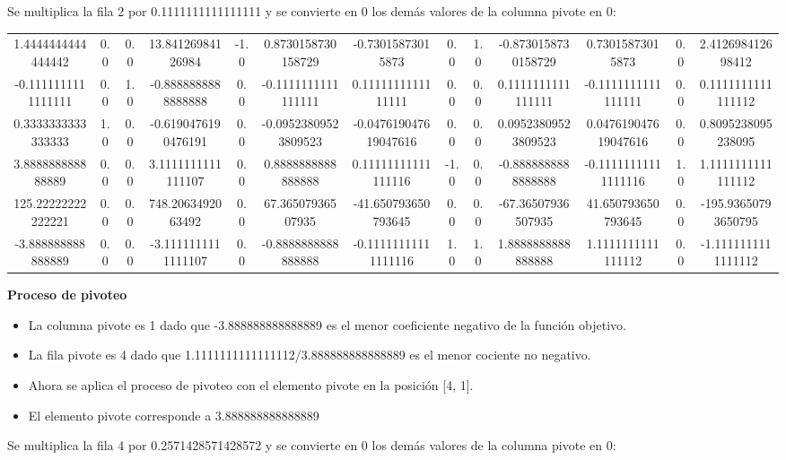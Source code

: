 \documentclass{article} %
\begin{document}
Se multiplica la fila  2 por 0.1111111111111111  y se convierte en 0 los demás valores de la columna pivote en 0: 
\begin{center}
\begin{tabular}{|cccccccccccc|c|}\hline
1.4444444444444442 & 0.0 & 0.0 & 13.84126984126984 & -1.0 & 0.8730158730158729 & -0.73015873015873 & 0.0 & 1.0 & -0.8730158730158729 & 0.73015873015873 & 0.0 & 2.412698412698412  \\
-0.1111111111111111 & 0.0 & 1.0 & -0.8888888888888888 & 0.0 & -0.1111111111111111 & 0.1111111111111111 & 0.0 & 0.0 & 0.1111111111111111 & -0.1111111111111111 & 0.0 & 0.1111111111111112  \\
0.3333333333333333 & 1.0 & 0.0 & -0.6190476190476191 & 0.0 & -0.09523809523809523 & -0.047619047619047616 & 0.0 & 0.0 & 0.09523809523809523 & 0.047619047619047616 & 0.0 & 0.8095238095238095  \\
3.888888888888889 & 0.0 & 0.0 & 3.1111111111111107 & 0.0 & 0.8888888888888888 & 0.11111111111111116 & -1.0 & 0.0 & -0.8888888888888888 & -0.11111111111111116 & 1.0 & 1.1111111111111112  \\
\hline
125.22222222222221 & 0.0 & 0.0 & 748.2063492063492 & 0.0 & 67.36507936507935 & -41.650793650793645 & 0.0 & 0.0 & -67.36507936507935 & 41.650793650793645 & 0.0 & -195.93650793650795  \\
-3.888888888888889 & 0.0 & 0.0 & -3.1111111111111107 & 0.0 & -0.8888888888888888 & -0.11111111111111116 & 1.0 & 1.0 & 1.8888888888888888 & 1.1111111111111112 & 0.0 & -1.1111111111111112  \\
\hline
\end{tabular}
\end{center}
\textbf{Proceso de pivoteo}
\begin{itemize}
\item La columna pivote es 1 dado que -3.888888888888889  es el menor coeficiente negativo de la función objetivo.
\item La fila pivote es 4 dado que 1.1111111111111112/3.888888888888889 es el menor cociente no negativo.
\item Ahora se aplica el proceso de pivoteo con el elemento pivote en la posición [4, 1].
\item El elemento pivote corresponde a 3.888888888888889
\end{itemize}
Se multiplica la fila  4 por 0.2571428571428572  y se convierte en 0 los demás valores de la columna pivote en 0: 
\end{document}
